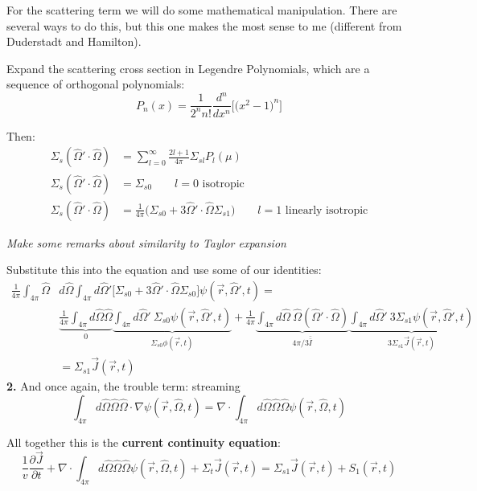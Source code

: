 \documentclass[12pt]{article}
\newcommand{\vOmega}{\ensuremath{\hat{\Omega}}}
\begin{document}
For the scattering term we will do some mathematical manipulation. There are several ways to do this, but this one makes the most sense to me (different from Duderstadt and Hamilton).

Expand the scattering cross section in Legendre Polynomials, which are a sequence of orthogonal polynomials:
%
\[P_n(x) = \frac{1}{2^n n!}\frac{d^n}{dx^n} \bigl[\bigl( x^2 -1 \bigr)^n\bigr] \]

Then:
\begin{align}
\Sigma_s(\vOmega' \cdot \vOmega) &= \sum_{l=0}^{\infty} \frac{2l+1}{4\pi} \Sigma_{sl} P_l(\mu) \\
\Sigma_s(\vOmega' \cdot \vOmega) &=  \Sigma_{s0} \qquad l=0 \text{ isotropic} \\
\Sigma_s(\vOmega' \cdot \vOmega) &=  \frac{1}{4\pi}\bigl( \Sigma_{s0} + 3\vOmega' \cdot \vOmega \Sigma_{s1} \bigr) \qquad l=1 \text{ linearly isotropic}
\end{align}

\textit{Make some remarks about similarity to Taylor expansion}

Substitute this into the equation and use some of our identities:
%
\begin{align}
\frac{1}{4\pi} \int_{4\pi}  \vOmega &d\vOmega \int_{4\pi} d\vOmega' \bigl[\Sigma_{s0} + 3\vOmega' \cdot \vOmega \Sigma_{s0} \bigr] \psi(\vec{r}, \vOmega', t) = \nonumber\\
%
& \underbrace{\frac{1}{4\pi} \int_{4\pi} d\vOmega \vOmega}_{0}  \underbrace{\int_{4\pi} d\vOmega'\:  \Sigma_{s0}\psi(\vec{r}, \vOmega', t)}_{\Sigma_{s0} \phi(\vec{r},t)} +
%
\frac{1}{4\pi} \underbrace{\int_{4\pi} d\vOmega \:\vOmega (\vOmega' \cdot \vOmega)}_{4\pi/3 \bar{\bar{I}}} \underbrace{\int_{4\pi} d\vOmega'\: 3  \Sigma_{s1}\psi(\vec{r}, \vOmega', t)}_{3\Sigma_{s1} \vec{J}(\vec{r},t)} \\
%
&= \boxed{\Sigma_{s1} \vec{J}(\vec{r},t)}
\end{align}
\textbf{2.} And once again, the trouble term: streaming
%
\[\int_{4\pi} d\vOmega \vOmega \vOmega \cdot \nabla \psi(\vec{r}, \vOmega, t) = \nabla \cdot \int_{4\pi} d\vOmega \vOmega \vOmega \psi(\vec{r}, \vOmega, t) \]

\vspace*{2em}
All together this is the \textbf{current continuity equation}:
\begin{equation}
\frac{1}{v}\frac{\partial \vec{J}}{\partial t} 
+ \nabla \cdot \int_{4\pi} d\vOmega \vOmega \vOmega \psi(\vec{r}, \vOmega, t) +
\Sigma_t  \vec{J}(\vec{r}, t) =
\Sigma_{s1} \vec{J}(\vec{r},t)
+ S_{1}(\vec{r}, t) 
\label{eq:current1}
\end{equation}
\end{document}
